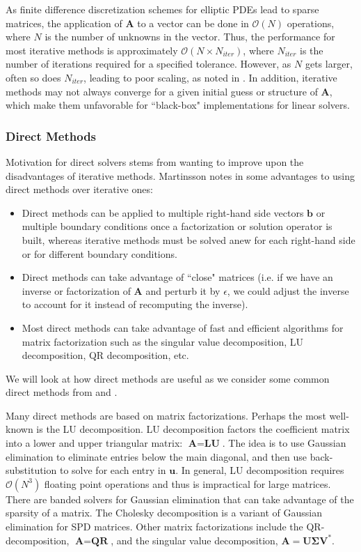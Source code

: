 As finite difference discretization schemes for elliptic PDEs lead to sparse matrices, the application of $\textbf{A}$ to a vector can be done in $\mathcal{O}(N)$ operations, where $N$ is the number of unknowns in the vector. Thus, the performance for most iterative methods is approximately $\mathcal{O}(N \times N_{iter})$, where $N_{iter}$ is the number of iterations required for a specified tolerance. However, as $N$ gets larger, often so does $N_{iter}$, leading to poor scaling, as noted in \citep{martinsson2019fast}. In addition, iterative methods may not always converge for a given initial guess or structure of $\textbf{A}$, which make them unfavorable for ``black-box" implementations for linear solvers.

\subsubsection{Direct Methods}
\label{sub:direct-methods}

Motivation for direct solvers stems from wanting to improve upon the disadvantages of iterative methods. Martinsson notes in \citep{martinsson2004fast} some advantages to using direct methods over iterative ones:
\begin{itemize}
    \item Direct methods can be applied to multiple right-hand side vectors $\textbf{b}$ or multiple boundary conditions once a factorization or solution operator is built, whereas iterative methods must be solved anew for each right-hand side or for different boundary conditions.

    \item Direct methods can take advantage of ``close" matrices (i.e. if we have an inverse or factorization of $\textbf{A}$ and perturb it by $\epsilon$, we could adjust the inverse to account for it instead of recomputing the inverse).

    \item Most direct methods can take advantage of fast and efficient algorithms for matrix factorization such as the singular value decomposition, LU decomposition, QR decomposition, etc.
\end{itemize}
We will look at how direct methods are useful as we consider some common direct methods from \citep{leveque2007finite} and \citep{trefethen1997numerical}.

Many direct methods are based on matrix factorizations. Perhaps the most well-known is the LU decomposition. LU decomposition factors the coefficient matrix into a lower and upper triangular matrix: $\textbf{A} = \textbf{L} \textbf{U}$. The idea is to use Gaussian elimination to eliminate entries below the main diagonal, and then use back-substitution to solve for each entry in $\textbf{u}$. In general, LU decomposition requires $\mathcal{O}(N^3)$ floating point operations and thus is impractical for large matrices. There are banded solvers for Gaussian elimination that can take advantage of the sparsity of a matrix. The Cholesky decomposition is a variant of Gaussian elimination for SPD matrices. Other matrix factorizations include the QR-decomposition, $\textbf{A} = \textbf{Q} \textbf{R}$, and the singular value decomposition, $\textbf{A} = \textbf{U} \boldsymbol{\Sigma} \textbf{V}^*$.

